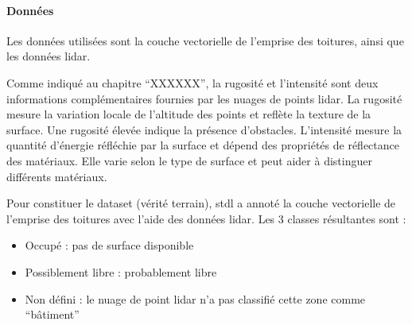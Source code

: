 \paragraph{Données}
\par{Les données utilisées sont la couche vectorielle de l'emprise des toitures, ainsi que les données \gls{lidar}.}
\par{Comme indiqué au chapitre ``XXXXXX'', la rugosité et l'intensité sont deux informations complémentaires fournies par les nuages de points \gls{lidar}. La rugosité mesure la variation locale de l'altitude des points et reflète la texture de la surface. Une rugosité élevée indique la présence d'obstacles. L'intensité mesure la quantité d'énergie réfléchie par la surface et dépend des propriétés de réflectance des matériaux. Elle varie selon le type de surface et peut aider à distinguer différents matériaux.}
\par{Pour constituer le dataset (vérité terrain), \acrshort{stdl} a annoté la couche vectorielle de l'emprise des toitures avec l'aide des données \gls{lidar}. Les 3 classes résultantes sont :}
\begin{itemize}
    \item Occupé : pas de surface disponible
    \item Possiblement libre : probablement libre
    \item Non défini : le nuage de point \gls{lidar} n'a pas classifié cette zone comme ``bâtiment''
\end{itemize}


